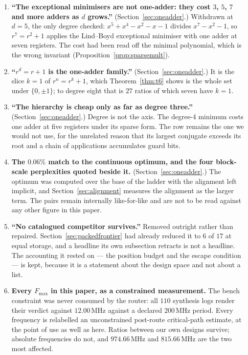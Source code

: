 \documentclass[11pt]{article}
\theoremstyle{definition}
\begin{document}
\begin{enumerate}[leftmargin=*,itemsep=3pt]
\item \textbf{``The exceptional minimisers are not one-adder: they cost $3$, $5$,
$7$ and more adders as $d$ grows.''} (Section~\ref{sec:oneadder}.) Withdrawn at
$d=5$, the only degree checked: $x^5+x^4-x^2-x-1$ divides $x^7-x^2-1$, so
$r^{7}=r^{2}+1$ applies the Lind--Boyd exceptional minimiser with one adder at
seven registers. The cost had been read off the minimal polynomial, which is the
wrong invariant (Proposition~\ref{prop:sparsemult}).

\item \textbf{``$r^{d}=r+1$ is the one-adder family.''}
(Section~\ref{sec:oneadder}.) It is the slice $k=1$ of $r^{n}=r^{k}+1$, which
Theorem~\ref{thm:t6} shows is the whole set under $\{0,\pm1\}$; to degree eight
that is $27$ ratios of which seven have $k=1$.

\item \textbf{``The hierarchy is cheap only as far as degree three.''}
(Section~\ref{sec:oneadder}.) Degree is not the axis. The degree-4 minimum costs
one adder at five registers under its sparse form. The row remains the one we
would not use, for the unrelated reason that its largest conjugate exceeds its
root and a chain of applications accumulates guard bits.

\item \textbf{The $0.06\%$ match to the continuous optimum, and the four
block-scale perplexities quoted beside it.} (Section~\ref{sec:oneadder}.) The
optimum was computed over the base of the ladder with the alignment left
implicit, and Section~\ref{sec:alignment} measures the alignment as the larger
term. The pairs remain internally like-for-like and are not to be read against
any other figure in this paper.

\item \textbf{``No catalogued competitor survives.''} Removed outright rather
than repaired. Section~\ref{sec:packedfrontier} had already reduced it to $6$ of
$17$ at equal storage, and a headline its own subsection retracts is not a
headline. The accounting it rested on --- the position budget and the escape
condition --- is kept, because it is a statement about the design space and not
about a list.

\item \textbf{Every $F_{\max}$ in this paper, as a constrained measurement.} The
bench constraint was never consumed by the router: all $110$ synthesis logs
render their verdict against $12.00$\,MHz against a declared $200$\,MHz period.
Every frequency is relabelled an unconstrained post-route critical-path estimate,
at the point of use as well as here. Ratios between our own designs survive;
absolute frequencies do not, and $974.66$\,MHz and $815.66$\,MHz are the two most
affected.

\end{enumerate}
\end{document}
